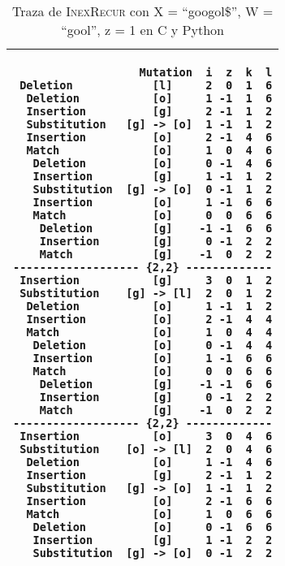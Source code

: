 \documentclass{article}
\newcommand{\tempcaption}{}
\newenvironment{code}[4]
{
\begin{table}[h!]
\gdef\tempcaption{Traza de \textsc{InexRecur} con X = ``#1'', W = ``#2'', z = #3 en #4}
\centering
\begin{tabular}{|c|}
\hline
}
{
\\\hline
\end{tabular}
\caption{\tempcaption}
\end{table}
}
\begin{document}
\newpage
\phantom{}
\vfill
\begin{code}{googol\$}{gool}{1}{C y Python}
\begin{lstlisting}
                   Mutation  i  z  k  l
 Deletion            [l]     2  0  1  6
  Deletion           [o]     1 -1  1  6
  Insertion          [g]     2 -1  1  2
  Substitution   [g] -> [o]  1 -1  1  2
  Insertion          [o]     2 -1  4  6
  Match              [o]     1  0  4  6
   Deletion          [o]     0 -1  4  6
   Insertion         [g]     1 -1  1  2
   Substitution  [g] -> [o]  0 -1  1  2
   Insertion         [o]     1 -1  6  6
   Match             [o]     0  0  6  6
    Deletion         [g]    -1 -1  6  6
    Insertion        [g]     0 -1  2  2
    Match            [g]    -1  0  2  2
------------------- {2,2} -------------
 Insertion           [g]     3  0  1  2
 Substitution    [g] -> [l]  2  0  1  2
  Deletion           [o]     1 -1  1  2
  Insertion          [o]     2 -1  4  4
  Match              [o]     1  0  4  4
   Deletion          [o]     0 -1  4  4
   Insertion         [o]     1 -1  6  6
   Match             [o]     0  0  6  6
    Deletion         [g]    -1 -1  6  6
    Insertion        [g]     0 -1  2  2
    Match            [g]    -1  0  2  2
------------------- {2,2} -------------
 Insertion           [o]     3  0  4  6
 Substitution    [o] -> [l]  2  0  4  6
  Deletion           [o]     1 -1  4  6
  Insertion          [g]     2 -1  1  2
  Substitution   [g] -> [o]  1 -1  1  2
  Insertion          [o]     2 -1  6  6
  Match              [o]     1  0  6  6
   Deletion          [o]     0 -1  6  6
   Insertion         [g]     1 -1  2  2
   Substitution  [g] -> [o]  0 -1  2  2
\end{lstlisting}
\end{code}
\vfill
\end{document}
